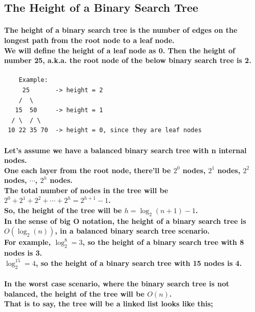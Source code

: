 \documentclass{article}
\begin{document}
\subsection{The Height of a Binary Search Tree}

\paragraph{
    The height of a binary search tree is the number of edges on the
    longest path from the root node to a leaf node.\\
    We will define the height of a leaf node as 0. Then the height of number 25, 
    a.k.a. the root node of the below binary search tree is 2.\\
}

\newpage

\begin{verbatim}
    Example:
     25       -> height = 2
    /  \
   15  50     -> height = 1
  / \  / \
 10 22 35 70  -> height = 0, since they are leaf nodes
\end{verbatim}

\paragraph{
    Let's assume we have a balanced binary search tree with n internal nodes.\\
    One each layer from the root node, there'll be $2^0$ nodes, $2^1$ nodes, $2^2$ nodes, $\cdots$, $2^h$ nodes.\\
    The total number of nodes in the tree will be $2^0+2^1+2^2+ \cdots +2^h=2^{h+1}-1$.\\
    So, the height of the tree will be $h=\log_2(n+1)-1$.\\
    In the sense of big O notation, the height of a binary search tree is $O(\log_2(n))$, in a balanced binary 
    search tree scenario.\\
    For example, $\log_2^8=3$, so the height of a binary search tree with 8 nodes is 3.\\
    $\log_2^{15}=4$, so the height of a binary search tree with 15 nodes is 4.\\
}

\paragraph{
    In the worst case scenario, where the binary search tree is not balanced, the height of the tree will be $O(n)$.\\
    That is to say, the tree will be a linked list looks like this;\\
}
\end{document}
